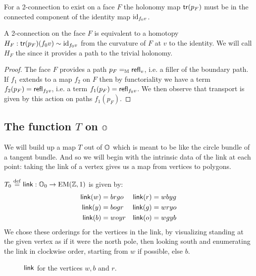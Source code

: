 For a 2-connection to exist on a face \( F \) the holonomy map \( \mathsf{tr}(p_F) \) must be in the connected component of the identity map \( \text{id}_{f_0v} \).

\begin{mylemma}
A 2-connection on the face \( F \) is equivalent to a homotopy \( H_F:\mathsf{tr}(p_F)(f_0v)\sim\text{id}_{f_0v} \) from the curvature of \( F \) at \( v \) to the identity. We will call \( H_F \) the  since it provides a path to the trivial holonomy.
\end{mylemma}
\begin{proof}
The face \( F \) provides a path \( p_F=_{\mathbb{M}}\mathsf{refl}_v \), i.e. a filler of the boundary path. If \( f_1 \) extends to a map \( f_2 \) on \( F \) then by functoriality we have a term \( f_2(p_F)=\mathsf{refl}_{f_2v} \), i.e. a term \( f_1(p_F)=\mathsf{refl}_{f_0v} \). We then observe that transport is given by this action on paths \( f_1(p_F) \).
\end{proof}

\subsection{The function \texorpdfstring{\( T \)}{T} on \texorpdfstring{\( \mathbb{O} \)}{O}}

We will build up a map \( T \) out of \( \mathbb{O} \) which is meant to be like the circle bundle of a tangent bundle. And so we will begin with the intrinsic data of the link at each point: taking the link of a vertex gives us a map from vertices to polygons.

\begin{mydef}
\( T_0\stackrel{\mathrm{def}}{=}\operatorname{\mathsf{link}}:\mathbb{O}_0\to\mathrm{EM}(\mathbb{Z},1) \) is given by:
\begin{align*}
\operatorname{\mathsf{link}}(w) &= brgo & \operatorname{\mathsf{link}}(r) &= wbyg \\
\operatorname{\mathsf{link}}(y) &= bogr & \operatorname{\mathsf{link}}(g) &= wryo \\
\operatorname{\mathsf{link}}(b) &= woyr & \operatorname{\mathsf{link}}(o) &= wgyb
\end{align*}
We chose these orderings for the vertices in the link, by visualizing standing at the given vertex as if it were the north pole, then looking south and enumerating the link in clockwise order, starting from \( w \) if possible, else \( b \).
\end{mydef}

\begin{figure}[htbp]
\centering

\caption{\( \operatorname{\mathsf{link}} \) for the vertices \( w, b\) and \( r \).}
\label{fig:triangle_of_equators}
\end{figure}

